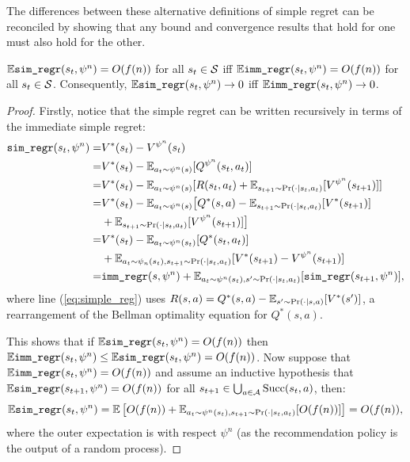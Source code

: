         The differences between these alternative definitions of simple regret can be reconciled by showing that any bound and convergence results that hold for one must also hold for the other.

        \begin{lemma} \label{lem:imm_simple_regret}
            $\mathbb{E}{\textnormal{\texttt{sim\_regr}}}(s_t,\psi^n)=O(f(n))$ for all $s_t\in\mathcal{S}$ iff $\mathbb{E}{\textnormal{\texttt{imm\_regr}}}(s_t,\psi^n)=O(f(n))$ for all $s_t\in\mathcal{S}$. Consequently, $\mathbb{E}{\textnormal{\texttt{sim\_regr}}}(s_t,\psi^n)\rightarrow 0$ iff $\mathbb{E}{\textnormal{\texttt{imm\_regr}}}(s_t,\psi^n)\rightarrow 0$.
        \end{lemma}
        \begin{proof}
            Firstly, notice that the simple regret can be written recursively in terms of the immediate simple regret:
            \begin{align}
                {\textnormal{\texttt{sim\_regr}}}(s_t,\psi^n) =& V^*(s_t) - V^{\psi^n}(s_t) \\
                    =& V^*(s_t) - \mathbb{E}_{a_t\sim\psi^n(s)}[Q^{\psi^n}(s_t,a_t)] \\
                    =& V^*(s_t) - \mathbb{E}_{a_t\sim\psi^n(s)}[R(s_t,a_t) +    
                        \mathbb{E}_{s_{t+1}\sim\Pr(\cdot|s_t,a_t)}[V^{\psi^n}(s_{t+1})]] \\
                    =& V^*(s_t) - \mathbb{E}_{a_t\sim\psi^n(s)}\big[Q^*(s,a) - 
                        \mathbb{E}_{s_{t+1}\sim\Pr(\cdot|s_t,a_t)}[V^*(s_{t+1})]  \notag \\
                        &+ \mathbb{E}_{s_{t+1}\sim\Pr(\cdot|s_t,a_t)}[V^{\psi^n}(s_{t+1})]\big] \label{eq:simple_reg} \\
                    =& V^*(s_t) - \mathbb{E}_{a_t\sim\psi^n(s_t)}[Q^*(s_t,a_t)] \notag \\
                        &+ \mathbb{E}_{a_t\sim\psi_n(s_t),s_{t+1}\sim\Pr(\cdot|s_t,a_t)}[
                            V^*(s_{t+1}) - V^{\psi^n}(s_{t+1})] \\
                    =& {\textnormal{\texttt{imm\_regr}}}(s,\psi^n) + 
                        \mathbb{E}_{a_t\sim\psi^n(s_t),s'\sim\Pr(\cdot|s_t,a_t)}[{\textnormal{\texttt{sim\_regr}}}(s_{t+1},\psi^n)], \label{eq:regret_relation}
            \end{align}
            where line (\ref{eq:simple_reg}) uses $R(s,a) = Q^*(s,a) - \mathbb{E}_{s'\sim\Pr(\cdot|s,a)}[V^*(s')]$, a rearrangement of the Bellman optimality equation for $Q^*(s,a)$.
            
            This shows that if $\mathbb{E}{\textnormal{\texttt{sim\_regr}}}(s_t,\psi^n)=O(f(n))$ then $\mathbb{E}{\textnormal{\texttt{imm\_regr}}}(s_t,\psi^n)\leq \mathbb{E}{\textnormal{\texttt{sim\_regr}}}(s_t,\psi^n) = O(f(n))$. Now suppose that $\mathbb{E}{\textnormal{\texttt{imm\_regr}}}(s_t,\psi^n)=O(f(n))$ and assume an inductive hypothesis that $\mathbb{E}{\textnormal{\texttt{sim\_regr}}}(s_{t+1},\psi^n)=O(f(n))$ for all $s_{t+1}\in\bigcup_{a\in\mathcal{A}}{\textnormal{Succ}(s_t,a)}$, then:
            \begin{align}
                \mathbb{E}{\textnormal{\texttt{sim\_regr}}}(s_t,\psi^n) = \mathbb{E}\left[ O(f(n)) + \mathbb{E}_{a_t\sim\psi^n(s_t),s_{t+1}\sim\Pr(\cdot|s_t,a_t)}[O(f(n))] \right] = O(f(n)),
            \end{align}
            where the outer expectation is with respect $\psi^n$ (as the recommendation policy is the output of a random process).


\end{proof}
